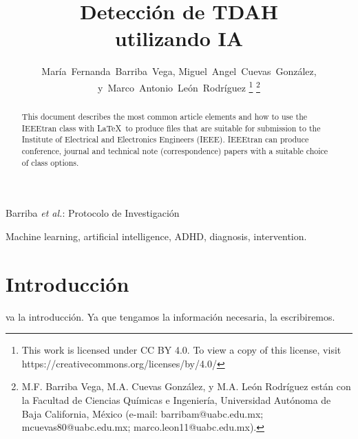 \documentclass[10pt,journal,compsoc]{IEEEtran}
\begin{document}
\title{Detección de TDAH \\ utilizando IA}

\author{María~Fernanda~Barriba~Vega,
    Miguel~Angel~Cuevas~González,
    y~Marco~Antonio~León~Rodríguez%
    \thanks{This work is licensed under CC BY 4.0. To view a copy of this license, visit https://creativecommons.org/licenses/by/4.0/}%
    \thanks{\indent M.F. Barriba Vega, M.A. Cuevas González, y M.A. León Rodríguez están con la Facultad de Ciencias Químicas e Ingeniería, Universidad Autónoma de Baja California, México (e-mail: barribam@uabc.edu.mx; mcuevas80@uabc.edu.mx; marco.leon11@uabc.edu.mx).}}

%
{Barriba \MakeLowercase{\textit{et al.}}: Protocolo de Investigación}

\maketitle

\begin{abstract}
    This document describes the most common article elements and how to use the IEEEtran class with \LaTeX \ to produce files that are suitable for submission to the Institute of Electrical and Electronics Engineers (IEEE).  IEEEtran can produce conference, journal and technical note (correspondence) papers with a suitable choice of class options.
\end{abstract}

\begin{IEEEkeywords}
    Machine learning, artificial intelligence, ADHD, diagnosis, intervention.
\end{IEEEkeywords}

\section{Introducción}
 va la introducción. Ya que tengamos la información necesaria, la escribiremos.
\end{document}
